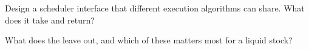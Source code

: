\begin{interviewq}\label{iq:mx:the-almgren-chriss-framework:5}
Design a scheduler interface that different execution algorithms can share. What does it take and return?
\end{interviewq}

\begin{interviewq}\label{iq:mx:the-almgren-chriss-framework:6}
What does the  leave out, and which of these matters most for a liquid stock?
\end{interviewq}
